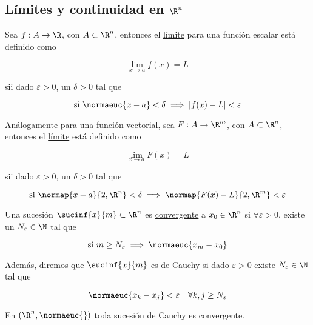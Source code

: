 \subsection{Límites y continuidad en $\R^n$}

\begin{defn}
    Sea $f : A \rightarrow \R$, con $A \subset \R^n$, entonces el \ul{límite} para una función escalar está definido como
    
    \[
    \lim_{x \to a} f(x) = L
    \]
    
    \noindent sii dado $\varepsilon > 0$, un $\delta > 0$ tal que
    
    \[
    \text{si $\normaeuc{x-a} < \delta$} \implies |f(x) - L| < \varepsilon
    \]
    
    Análogamente para una función vectorial, sea $F : A \rightarrow \R^m$, con $A \subset \R^n$, entonces el \ul{límite} está definido como
    
    \[
    \lim_{x \to a} F(x) = L
    \]
    
    \noindent sii dado $\varepsilon > 0$, un $\delta > 0$ tal que
    
    \[
    \text{si $\normap{x-a}{2, \R^n} < \delta$} \implies \normap{F(x)-L}{2, \R^m} < \varepsilon
    \]
\end{defn}

\begin{defn}
    Una sucesión $\sucinf{x}{m} \subset \R^n$ es \ul{convergente} a $x_0 \in \R^n$ si $\forall \varepsilon > 0$, existe un $N_{\varepsilon} \in \N$ tal que
    
    \[
    \text{si $m \geq N_{\varepsilon}$} \implies \normaeuc{x_m - x_0}
    \]
    
    Además, diremos que $\sucinf{x}{m}$ es de \ul{Cauchy} si dado $\varepsilon > 0$ existe $N_{\varepsilon} \in \N$ tal que
    
    \[
    \normaeuc{x_k - x_j} < \varepsilon \quad \forall k,j \geq N_{\varepsilon}
    \]
\end{defn}

\begin{teo}
    En $(\R^n, \normaeuc{ })$ toda sucesión de Cauchy es convergente.
\end{teo}

